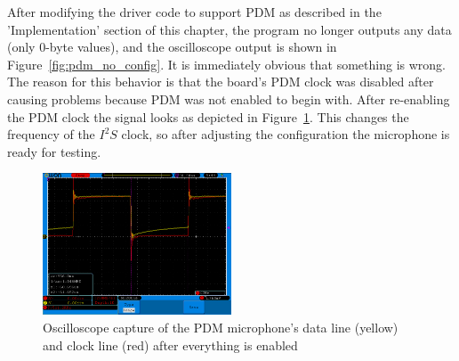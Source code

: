After modifying the driver code to support PDM as described in the 'Implementation' section of this chapter,
the program no longer outputs any data (only 0-byte values), and the oscilloscope output is shown in Figure~\ref{fig:pdm_no_config}.
It is immediately obvious that something is wrong.
The reason for this behavior is that the board's PDM clock was disabled after causing problems because PDM was not enabled to begin with.
After re-enabling the PDM clock the signal looks as depicted in Figure~\ref{fig:pdm_working}.
This changes the frequency of the $I^2S$ clock, so after adjusting the configuration the microphone is ready for testing.

\begin{figure}[H]
    \begin{center}
        \includegraphics[width=0.5\textwidth]{figures/pdm_working.png}
    \end{center}
    \caption[Oscilloscope capture of the PDM microphone's data line (yellow) and clock line (red) after everything is enabled]
    {Oscilloscope capture of the PDM microphone's data line (yellow) and clock line (red) after everything is enabled}
    \label{fig:pdm_working}
\end{figure}

